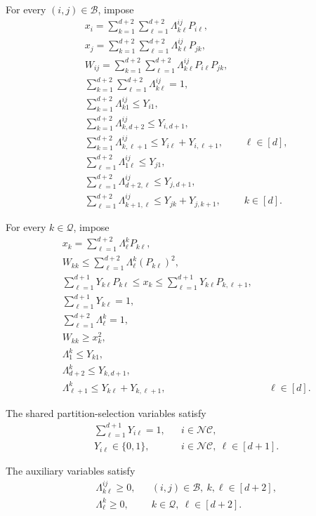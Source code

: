 \documentclass{article}
\begin{document}
For every $(i,j)\in\mathcal{B}$, impose
\begin{align}
&x_i=\sum_{k=1}^{d+2}\sum_{\ell=1}^{d+2}\Lambda^{ij}_{k\ell}P_{i\ell},
\label{eq:pairx1}\\
&x_j=\sum_{k=1}^{d+2}\sum_{\ell=1}^{d+2}\Lambda^{ij}_{k\ell}P_{jk},
\label{eq:pairx2}\\
&W_{ij}=\sum_{k=1}^{d+2}\sum_{\ell=1}^{d+2}\Lambda^{ij}_{k\ell}P_{i\ell}P_{jk},
\label{eq:pairw}\\
&\sum_{k=1}^{d+2}\sum_{\ell=1}^{d+2}\Lambda^{ij}_{k\ell}=1,
\label{eq:pairnormalization}\\
&\sum_{k=1}^{d+2}\Lambda^{ij}_{k1}\leq Y_{i1},
\label{eq:pairleftendpoint}\\
&\sum_{k=1}^{d+2}\Lambda^{ij}_{k,d+2}\leq Y_{i,d+1},
\label{eq:pairrightendpoint}\\
&\sum_{k=1}^{d+2}\Lambda^{ij}_{k,\ell+1}\leq Y_{i\ell}+Y_{i,\ell+1},
&&\ell\in[d],
\label{eq:pairiinterior}\\
&\sum_{\ell=1}^{d+2}\Lambda^{ij}_{1\ell}\leq Y_{j1},
\label{eq:pairjleftendpoint}\\
&\sum_{\ell=1}^{d+2}\Lambda^{ij}_{d+2,\ell}\leq Y_{j,d+1},
\label{eq:pairjrightendpoint}\\
&\sum_{\ell=1}^{d+2}\Lambda^{ij}_{k+1,\ell}\leq Y_{jk}+Y_{j,k+1},
&& k\in[d].
\label{eq:pairjinterior}
\end{align}

For every $k\in\mathcal{Q}$, impose
\begin{align}
&x_k=\sum_{\ell=1}^{d+2}\Lambda^k_\ell P_{k\ell},
\label{eq:diagx}\\
&W_{kk}\leq\sum_{\ell=1}^{d+2}\Lambda^k_\ell(P_{k\ell})^2,
\label{eq:diagupper}\\
&\sum_{\ell=1}^{d+1}Y_{k\ell}P_{k\ell}
 \leq x_k\leq
 \sum_{\ell=1}^{d+1}Y_{k\ell}P_{k,\ell+1},
\label{eq:diaginterval}\\
&\sum_{\ell=1}^{d+1}Y_{k\ell}=1,
\label{eq:diagpartition}\\
&\sum_{\ell=1}^{d+2}\Lambda^k_\ell=1,
\label{eq:diagnormalization}\\
&W_{kk}\geq x_k^2,
\label{eq:diaglower}\\
&\Lambda^k_1\leq Y_{k1},
\label{eq:diagleftendpoint}\\
&\Lambda^k_{d+2}\leq Y_{k,d+1},
\label{eq:diagrightendpoint}\\
&\Lambda^k_{\ell+1}\leq Y_{k\ell}+Y_{k,\ell+1},
&&\ell\in[d].
\label{eq:diaginterior}
\end{align}

The shared partition-selection variables satisfy
\begin{align}
&\sum_{\ell=1}^{d+1}Y_{i\ell}=1,
&& i\in\mathcal{NC},
\label{eq:partitiononehot}\\
&Y_{i\ell}\in\{0,1\},
&& i\in\mathcal{NC},\ \ell\in[d+1].
\label{eq:binary}
\end{align}

The auxiliary variables satisfy
\begin{align}
&\Lambda^{ij}_{k\ell}\geq 0,
&& (i,j)\in\mathcal{B},\ k,\ell\in[d+2],
\label{eq:pairnonnegative}\\
&\Lambda^k_\ell\geq 0,
&& k\in\mathcal{Q},\ \ell\in[d+2].
\label{eq:diagnonnegative}
\end{align}
\end{document}
